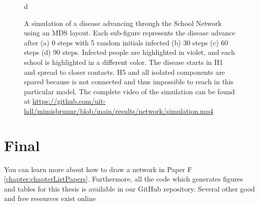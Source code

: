 \begin{figure}[ht]
\begin{minipage}[b]{0.45\linewidth}
        \caption{d}
    \end{minipage}
    \caption{A simulation of a disease advancing through the School Network using an MDS layout. Each sub-figure represents the disease advance after (a) 0 steps with 5 random initials infected (b) 30 steps (c) 60 steps (d) 90 steps. Infected people are highlighted in violet, and each school is highlighted in a different color. The disease starts in H1 and spread to closer contacts. H5 and all isolated components are spared because is not connected and thus impossible to reach in this particular model. The complete video of the simulation can be found at \url{https://github.com/uit-hdl/mimisbrunnr/blob/main/results/network/simulation.mp4}}
    \label{fig:networkVideo}
\end{figure}



\section{Final}

You can learn more about how to draw a network in Paper F \ref{chapter:chapterListPapers}. Furthermore, all the code which generates figures and tables for this thesis is available in our GitHub repository. Several other good and free resources exist online %
